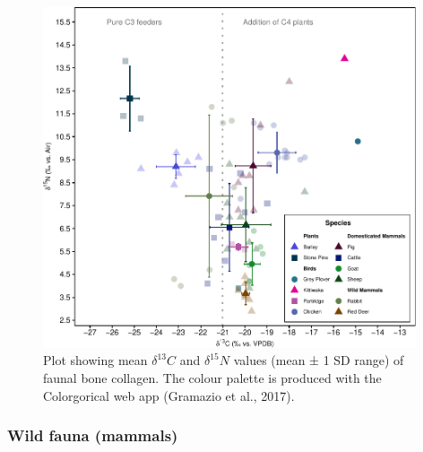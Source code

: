 \documentclass[review]{elsarticle} %
\begin{document}
\begin{figure}
\includegraphics[width=0.98\textwidth]{castro_main_body_files/figure-latex/fauna-carbnitro-iso-plot-1} \caption{Plot showing mean \(\delta ^{13}C\) and \(\delta ^{15}N\) values (mean ± 1 SD range) of faunal bone collagen. The colour palette is produced with the Colorgorical web app (Gramazio et al., 2017).}\label{fig:fauna-carbnitro-iso-plot}
\end{figure}

\hypertarget{wild-fauna-mammals}{%
\subsubsection{Wild fauna (mammals)}\label{wild-fauna-mammals}}
\end{document}
